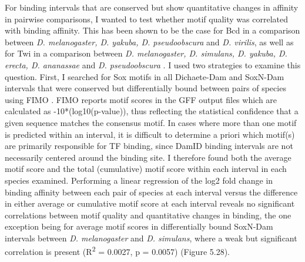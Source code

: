 For binding intervals that are conserved but show quantitative changes in affinity in pairwise comparisons, I wanted to test whether motif quality was correlated with binding affinity. This has been shown to be the case for Bcd in a comparison between \emph{D. melanogaster, D. yakuba, D. pseudoobscura} and \emph{D. virilis}, as well as for Twi in a comparison between \emph{D. melanogaster, D. simulans, D. yakuba, D. erecta, D. ananassae} and \emph{D. pseudoobscura} \citep{he_high_2011,paris_extensive_2013}. I used two strategies to examine this question. First, I searched for Sox motifs in all Dichaete-Dam and SoxN-Dam intervals that were conserved but differentially bound between pairs of species using FIMO \citep{grant_fimo:_2011}. FIMO reports motif scores in the GFF output files which are calculated as -10*(log10(p-value)), thus reflecting the statistical confidence that a given sequence matches the consensus motif. In cases where more than one motif is predicted within an interval, it is difficult to determine a priori which motif(s) are primarily responsible for TF binding, since DamID binding intervals are not necessarily centered around the binding site. I therefore found both the average motif score and the total (cumulative) motif score within each interval in each species examined. Performing a linear regression of the log2 fold change in binding affinity between each pair of species at each interval versus the difference in either average or cumulative motif score at each interval reveals no significant correlations between motif quality and quantitative changes in binding, the one exception being for average motif scores in differentially bound SoxN-Dam intervals between \emph{D. melanogaster} and \emph{D. simulans}, where a weak but significant correlation is present (R\textsuperscript{2} = 0.0027, p = 0.0057) (Figure 5.28).\\
 
